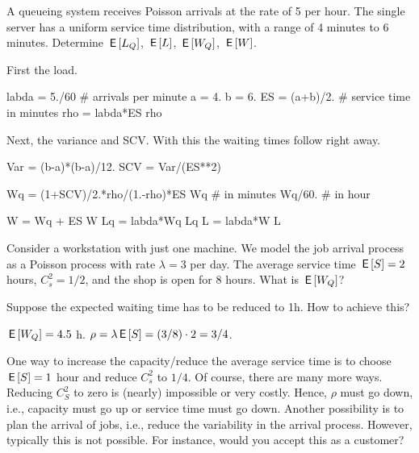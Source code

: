 \begin{exercise}
 A queueing system receives Poisson arrivals at the rate of 5 per hour.
 The single server has a uniform service time distribution, with a range of 4 minutes to 6 minutes.
 Determine $\,\mathsf{E}\left[L_Q\right]$, $\,\mathsf{E}\left[L\right]$, $\,\mathsf{E}\left[W_Q\right]$, $\,\mathsf{E}\left[W\right]$.
\begin{solution}
First the load.
\begin{pyconsole}
labda = 5./60 # arrivals per minute
a = 4.
b = 6.
ES = (a+b)/2. # service time in minutes
rho = labda*ES
rho
\end{pyconsole}

Next, the variance and SCV. With this the waiting times follow right away.
\begin{pyconsole}
Var = (b-a)*(b-a)/12.
SCV = Var/(ES**2)


Wq = (1+SCV)/2.*rho/(1.-rho)*ES
Wq # in minutes
Wq/60. # in hour


W = Wq + ES
W
Lq = labda*Wq
Lq
L = labda*W
L
\end{pyconsole}
\end{solution}
\end{exercise}



\begin{exercise}
 Consider a workstation with just one machine.
 We model the job arrival process as a Poisson process with rate $\lambda=3$ per day.
 The average service time $\,\mathsf{E}\left[S\right] = 2$ hours, $C^2_s = 1/2$, and the shop is open for 8 hours.
 What is $\,\mathsf{E}\left[W_Q\right]$?

 Suppose the expected waiting time has to be reduced to 1h.
 How to achieve this?
\begin{solution}
 $\,\mathsf{E}\left[W_Q\right] = 4.5$ h. $\rho = \lambda \,\mathsf{E}\left[S\right] = (3/8)\cdot 2 = 3/4$.

 One way to increase the capacity/reduce the average service time is to choose $\,\mathsf{E}\left[S\right] =1$ hour and reduce $C^2_s$ to $1/4$.
 Of course, there are many more ways.
 Reducing $C^2_S$ to zero is (nearly) impossible or very costly.
 Hence, $\rho$ must go down, i.e., capacity must go up or service time must go down.
 Another possibility is to plan the arrival of jobs, i.e., reduce the variability in the arrival process.
 However, typically this is not possible.
 For instance, would you accept this as a customer?
\end{solution}
\end{exercise}


